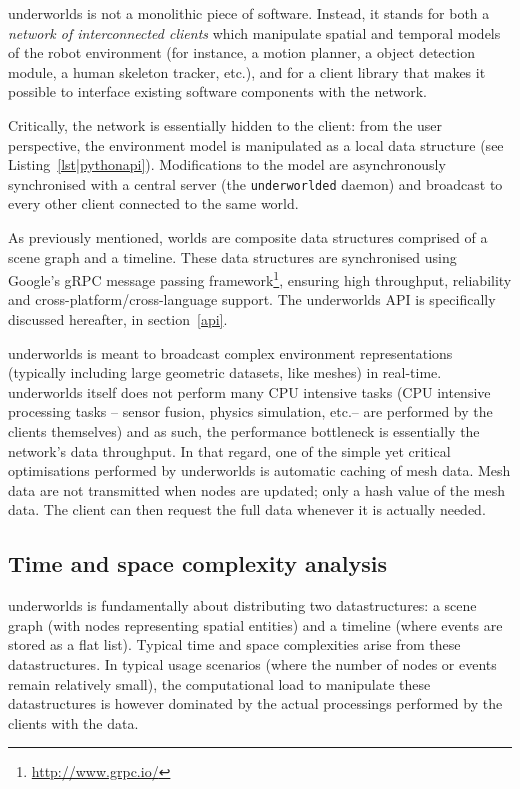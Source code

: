 \documentclass[letterpaper, 10pt, conference]{ieeeconf}
\newcommand{\etc}{etc.\xspace}
\newcommand{\uwds}{{\sc underworlds}\xspace}
\begin{document}
\uwds is not a monolithic piece of software. Instead, it stands for both a
\emph{network of interconnected clients} which manipulate spatial and temporal
models of the robot environment (for instance, a motion planner, a object
detection module, a human skeleton tracker, etc.), and for a {client library}
that makes it possible to interface existing software components with the network.

Critically, the network is essentially hidden to the client: from the user
perspective, the environment model is manipulated as a local data structure (see
Listing~\ref{lst|pythonapi}). Modifications to the model are asynchronously synchronised with
a central server (the {\tt underworlded} daemon) and broadcast to every other
client connected to the same world.

As previously mentioned, worlds are composite data structures comprised of a
scene graph and a timeline. These data structures are synchronised using
Google's gRPC message passing framework\footnote{\url{http://www.grpc.io/}}, ensuring
high throughput, reliability and cross-platform/cross-language support. The \uwds
API is specifically discussed hereafter, in section~\ref{api}.


\uwds is meant to broadcast complex environment representations (typically
including large geometric datasets, like meshes) in real-time. \uwds itself does
not perform many CPU intensive tasks (CPU intensive processing tasks -- sensor
fusion, physics simulation, \etc -- are performed by the clients themselves) and
as such, the performance bottleneck is essentially the network's data
throughput.  In that regard, one of the simple yet critical optimisations
performed by \uwds is automatic caching of mesh data. Mesh data are not
transmitted when nodes are updated; only a hash value of the mesh data. The
client can then request the full data whenever it is actually needed.


\subsection{Time and space complexity analysis}

\uwds is fundamentally about distributing two datastructures: a scene graph
(with nodes representing spatial entities) and a timeline (where events are
stored as a flat list). Typical time and space complexities arise from these
datastructures. In typical usage scenarios (where the number of nodes or events
remain relatively small), the computational load to manipulate these
datastructures is however dominated by the actual processings performed by the
clients with the data.
\end{document}
